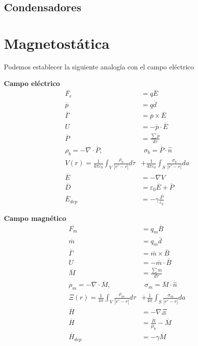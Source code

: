 \documentclass[leqno]{article}
\begin{document}
\subsection{Condensadores}



\section{Magnetostática}
Podemos establecer la siguiente analogía con el campo eléctrico

\begin{minipage}{0.5\textwidth}
  \centering 
  \textbf{Campo eléctrico}
\begin{align*}
  \overline{F_e} &= q\overline{E} \\
  \overline{p} &= q \overline{d}\\
  \overline{\Gamma} &= \overline{p}\times \overline{E} \\
  U &= -\overline{p}\cdot \overline{E}\\
  \overline{P} &= \frac{\sum \overline{p}}{d\tau  }\\
  \rho _b = -\nabla\cdot \overline{P},& \ \  \sigma _b = \overline{P}\cdot \hat{n}\\
  V(r)=\frac{1}{4\pi\varepsilon _0}\int_V \frac{\rho _b}{ |r'-r|}d\tau &+ \frac{1}{4\pi\varepsilon _0}\int_S \frac{\sigma _b}{|r'-r|}da \\
  \overline{E} &= -\nabla V\\
  \overline{D} &= \varepsilon _0\overline{E} + \overline{P}\\
  \overline{E}_{dep} &= -\gamma \frac{\overline{P}}{\varepsilon _0}
\end{align*}
\end{minipage}
\begin{minipage}{0.5\textwidth}
  \centering
  \textbf{Campo magnético}
\begin{align*}
  \overline{F_m} &= q_m\overline{B} \\
  \overline{m} &= q_m \overline{d}\\
  \overline{\Gamma} &= \overline{m}\times \overline{B} \\
  U &= -\overline{m}\cdot \overline{B}\\
  \overline{M} &= \frac{\sum \overline{m}}{d\tau  }\\
  \rho _m = -\nabla\cdot \overline{M},& \ \  \sigma _m = \overline{M}\cdot \hat{n}\\
  \Xi(r)=\frac{1}{4\pi}\int_V \frac{\rho _m}{ |r'-r|}d\tau &+ \frac{1}{4\pi}\int_S \frac{\sigma _m}{|r'-r|}da\\
  \overline{H}&=-\nabla \Xi\\
  \overline{H} &= \frac{\overline{B}}{\mu_0} - \overline{M}\\
  \overline{H}_{dep} &= -\gamma \overline{M}
\end{align*}

\end{minipage}
\end{document}
